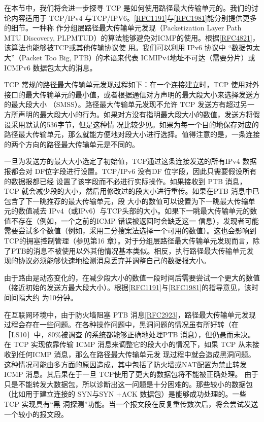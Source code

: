 在本节中，我们将会进一步探寻 TCP 是如何使用路径最大传输单元的。我们的讨论内容适用于 TCP/IPv4
与TCP/IPV6。\href{https://www.rfc-editor.org/rfc/rfc1191}{[RFC1191]}与\href{https://www.rfc-editor.org/rfc/rfc1981}{[RFC1981]}能分别提供更多的细节。一种称
作分组层路径最大传输单元发现（Packetization Layer Path MTU Discovery,
PLPMTUD）的算法能够避免对ICMP的使用。根据\href{https://www.rfc-editor.org/rfc/rfc4821}{[RFC4821]}，该算法也能够被TCP或其他传输协议使
用。我们可以利用 IPv6 协议中 “数据包太大”（Packet Too Big, PTB）的术语来代表
ICMIPv4地址不可达（需要分片）或ICMPv6 数据包太大的消息。

TCP 常规的路径最大传输单元发现过程如下：在一个连接建立时，TCP
使用对外接口的最大传输单元的最小值，或者根据通信对方声明的最大段大小来选择发送方的最大段大小
（SMSS）。路径最大传输单元发现不允许 TCP
发送方有超过另一方所声明的最大段大小的行为。如果对方没有指明最大段大小的数值，发送方将假设采用默认的536字节，但是这种情
况比较少见。如果为每一个目的地保存对应的路径最大传输单元，那么就能方便地对段大小进行选择。值得注意的是，一条连接的两个方向的路径最大传输单元是不同的。

一旦为发送方的最大大小选定了初始值，TCP通过这条连接发送的所有IPv4 数据报都会对 DF位字段进行设置。TCP/IPv6 没有DF
位字段，因此只需要假设所有的数据报都已经
设置了该字段而不必进行实际操作。如果接收到 PTB 消息，TCP 就会减少段的大小，然后用修改过的段大小进行重传。如果在PTB
消息中已包含了下一眺推荐的最大传输单元，段
大小的数值可以设置为下一眺最大传输单元的数值减去
IPv4（或IPv6）与TCP头部的大小。如果下一眺最大传输单元的数值不存在（例如，一个之前的ICMP 错误被返回时会缺乏这一
信息），发现者可能需要尝试多个数值（例如，采用二分搜案法选择一个可用的数值）。这也会影响到 TCP的拥塞控制管理（参见第16
章）。对于分组层路径最大传输单元发现而言，除
了PTB的消息不被使用以外其他情况基本类似。相反，执行路径最大传输单元发现的协议必须能够快速地检测消息丢弃并调整自己的数据报大小。

由于路由是动态变化的，在减少段大小的数值一段时间后需要尝试一个更大的数值（接近初始的发送方最大段大小）。根据\href{https://www.rfc-editor.org/rfc/rfc1191}{[RFC1191]}与\href{https://www.rfc-editor.org/rfc/rfc1981}{[RFC1981]}的指导意见，该时间间隔大约
为10分钟。

在互联网环境中，由于防火墙阻塞 PTB
消息\href{https://www.rfc-editor.org/rfc/rfc2923}{[RFC2923]}，路径最大传输单元发现过程会存在一些问题。在各种操作问题中，黑洞问题的情况虽有所好转（在［LS10］中，80\%被调查
的系统都能够正确地处理PTB 消息），但仍悬而未决。在 TCP 实现依靠传输 ICMP 消息来调整它的段大小的情况下，如果 TCP
从未接收到任何ICMP 消息，那么在路径最大传输单元发
现过程中就会造成黑洞问题。这种情况可能由多方面的原因造成，其中包括了防火墙或NAT配置为禁止转发ICMP 消息。其后果在于一旦
TCP使用了更大的数据包将不能被正确处理。
由于只是不能转发大数据包，所以诊断出这一问题是十分困难的。那些较小的数据包（比如用于建立连接的 SYN与SYN +ACK
数据包）是能够成功处理的。一些TCP 实现具有“黑
洞探测”功能。当一个报文段在反复重传数次后，将会尝试发送一个较小的报文段。
